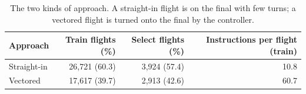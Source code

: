 \begin{table}[t]
\centering
\caption{The two kinds of approach. A straight-in flight is on the final with few turns; a vectored flight is turned onto
the final by the controller.}
\label{tab:dataset-strata}
\small
\renewcommand{\arraystretch}{1.2}
\begin{tabular}{@{}l r r r@{}}
\toprule
Approach & Train flights (\%) & Select flights (\%) & Instructions per flight (train) \\
\midrule
Straight-in & 26{,}721 (60.3) & 3{,}924 (57.4) & 10.8 \\
Vectored    & 17{,}617 (39.7) & 2{,}913 (42.6) & 60.7 \\
\bottomrule
\end{tabular}
\end{table}

